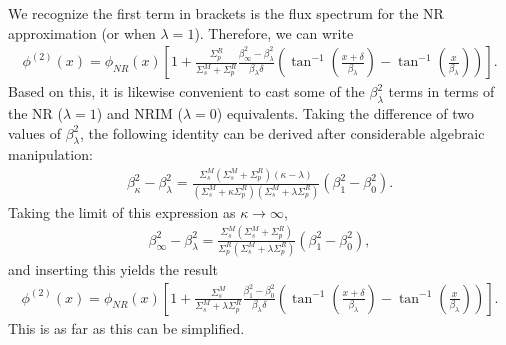 We recognize the first term in brackets is the flux spectrum for the NR approximation (or when $\lambda = 1$). Therefore, we can write
\begin{align}
  \phi^{(2)}(x)  = 
  \phi_{NR}(x) \left[ 1 + \frac{\Sigma_p^R}{\Sigma_s^M + \Sigma_p^R } \frac{  \beta_\infty^2 - \beta_\lambda^2 }{ \beta_\lambda \delta } 
  \left( \tan^{-1} \left( \frac{x+\delta}{\beta_\lambda} \right) - \tan^{-1} \left( \frac{x}{\beta_\lambda} \right) \right) \right].
\end{align}
Based on this, it is likewise convenient to cast some of the $\beta_\lambda^2$ terms in terms of the NR ($\lambda = 1$) and NRIM ($\lambda = 0$) equivalents. Taking the difference of two values of $\beta_\lambda^2$, the following identity can be derived after considerable algebraic manipulation:
\begin{align} \label{Eq:thermalization_IRbetaSquareIdentity}
  \beta_\kappa^2 - \beta_\lambda^2 = 
  \frac{ \Sigma_s^M ( \Sigma_s^M + \Sigma_p^R ) ( \kappa - \lambda ) }
       { ( \Sigma_s^M + \kappa \Sigma_p^R ) ( \Sigma_s^M + \lambda \Sigma_p^R ) } ( \beta_1^2 - \beta_0^2 ) .
\end{align}
Taking the limit of this expression as $\kappa \rightarrow \infty$,
\begin{align}
  \beta_\infty^2 - \beta_\lambda^2 = 
  \frac{ \Sigma_s^M ( \Sigma_s^M + \Sigma_p^R ) }
       { \Sigma_p^R ( \Sigma_s^M + \lambda \Sigma_p^R ) } ( \beta_1^2 - \beta_0^2 ) ,
\end{align}
and inserting this yields the result
\begin{align}
  \phi^{(2)}(x)  = 
  \phi_{NR}(x) \left[ 1 + \frac{\Sigma_s^M}{\Sigma_s^M + \lambda \Sigma_p^R } \frac{  \beta_1^2 - \beta_0^2 }{ \beta_\lambda \delta } 
  \left( \tan^{-1} \left( \frac{x+\delta}{\beta_\lambda} \right) - \tan^{-1} \left( \frac{x}{\beta_\lambda} \right) \right) \right].
\end{align}
This is as far as this can be simplified.

